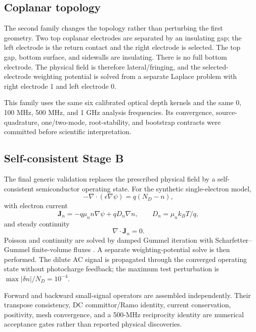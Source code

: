 \documentclass[11pt]{article}
\begin{document}
\subsection{Coplanar topology}

The second family changes the topology rather than perturbing the first geometry. Two top coplanar electrodes are separated by an insulating gap; the left electrode is the return contact and the right electrode is selected. The top gap, bottom surface, and sidewalls are insulating. There is no full bottom electrode. The physical field is therefore lateral/fringing, and the selected-electrode weighting potential is solved from a separate Laplace problem with right electrode 1 and left electrode 0.

This family uses the same six calibrated optical depth kernels and the same 0, 100 MHz, 500 MHz, and 1 GHz analysis frequencies. Its convergence, source-quadrature, one/two-mode, root-stability, and bootstrap contracts were committed before scientific interpretation.

\subsection{Self-consistent Stage B}

The final generic validation replaces the prescribed physical field by a self-consistent semiconductor operating state. For the synthetic single-electron model,
\begin{equation}
-\nabla\!\cdot(\epsilon\nabla\psi)=q(N_D-n),
\label{eq:poisson}
\end{equation}
with electron current
\begin{equation}
\bm J_n=-q\mu_n n\nabla\psi+qD_n\nabla n,
\qquad D_n=\mu_n k_BT/q,
\label{eq:current}
\end{equation}
and steady continuity
\begin{equation}
\nabla\!\cdot\bm J_n=0.
\label{eq:continuity}
\end{equation}
Poisson and continuity are solved by damped Gummel iteration with Scharfetter--Gummel finite-volume fluxes \cite{Gummel1964,ScharfetterGummel1969}. A separate weighting-potential solve is then performed. The dilute AC signal is propagated through the converged operating state without photocharge feedback; the maximum test perturbation is $\max|\delta n|/N_D=10^{-4}$.

Forward and backward small-signal operators are assembled independently. Their transpose consistency, DC committor/Ramo identity, current conservation, positivity, mesh convergence, and a 500-MHz reciprocity identity are numerical acceptance gates rather than reported physical discoveries.
\end{document}
